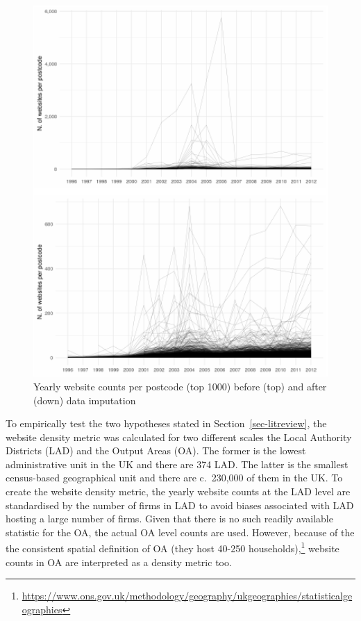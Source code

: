 \documentclass[
  authoryear,
  preprint,
  3p]{elsarticle}
\begin{document}
\begin{figure}[H]

{\centering \includegraphics[width=1\textwidth,height=0.7\textheight]{anonymised_files/figure-pdf/unnamed-chunk-2-1.pdf}

}

\caption{\label{correct}Yearly website counts per postcode (top 1000)
before (top) and after (down) data imputation}

\end{figure}%

To empirically test the two hypotheses stated in
Section~\ref{sec-litreview}, the website density metric was calculated
for two different scales the Local Authority Districts (LAD) and the
Output Areas (OA). The former is the lowest administrative unit in the
UK and there are 374 LAD. The latter is the smallest census-based
geographical unit and there are c.~230,000 of them in the UK. To create
the website density metric, the yearly website counts at the LAD level
are standardised by the number of firms in LAD to avoid biases
associated with LAD hosting a large number of firms. Given that there is
no such readily available statistic for the OA, the actual OA level
counts are used. However, because of the the consistent spatial
definition of OA (they host 40-250 households),\footnote{\url{https://www.ons.gov.uk/methodology/geography/ukgeographies/statisticalgeographies}}
website counts in OA are interpreted as a density metric too.
\end{document}
